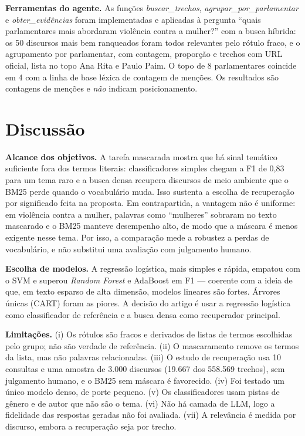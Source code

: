 \documentclass[12pt]{article}
\begin{document}
\textbf{Ferramentas do agente.} As funções \emph{buscar\_trechos}, \emph{agrupar\_por\_parlamentar}
e \emph{obter\_evidências} foram implementadas e aplicadas à pergunta ``quais parlamentares mais
abordaram violência contra a mulher?'' com a busca híbrida: os 50 discursos mais bem ranqueados
foram todos relevantes pelo rótulo fraco, e o agrupamento por parlamentar, com contagem, proporção
e trechos com URL oficial, lista no topo Ana Rita e Paulo Paim. O topo de 8 parlamentares coincide
em 4 com a linha de base léxica de contagem de menções. Os resultados são contagens de menções e
\emph{não} indicam posicionamento.

\section{Discussão}

\textbf{Alcance dos objetivos.} A tarefa mascarada mostra que há sinal temático suficiente fora
dos termos literais: classificadores simples chegam a F1 de 0,83 para um tema raro e a busca densa
recupera discursos de meio ambiente que o BM25 perde quando o vocabulário muda. Isso sustenta a
escolha de recuperação por significado feita na proposta. Em contrapartida, a vantagem não é
uniforme: em violência contra a mulher, palavras como ``mulheres'' sobraram no texto mascarado e o
BM25 manteve desempenho alto, de modo que a máscara é menos exigente nesse tema. Por isso, a
comparação mede a robustez a perdas de vocabulário, e não substitui uma avaliação com julgamento
humano.

\textbf{Escolha de modelos.} A regressão logística, mais simples e rápida, empatou com o SVM e
superou \textit{Random Forest} e AdaBoost em F1 --- coerente com a ideia de que, em texto esparso
de alta dimensão, modelos lineares são fortes. Árvores únicas (CART) foram as piores. A decisão
do artigo é usar a regressão logística como classificador de referência e a busca densa como
recuperador principal.

\textbf{Limitações.} (i) Os rótulos são fracos e derivados de listas de termos escolhidas pelo
grupo; não são verdade de referência. (ii) O mascaramento remove os termos da lista, mas não
palavras relacionadas. (iii) O estudo de recuperação usa 10 consultas e uma amostra de 3.000
discursos (19.667 dos 558.569 trechos), sem julgamento humano, e o BM25 sem máscara é favorecido. (iv)
Foi testado um único modelo denso, de porte pequeno. (v) Os classificadores usam pistas de gênero e
de autor que não são o tema. (vi) Não há camada de LLM, logo a fidelidade das respostas geradas
não foi avaliada. (vii) A relevância é medida por discurso, embora a recuperação seja por trecho.
\end{document}
